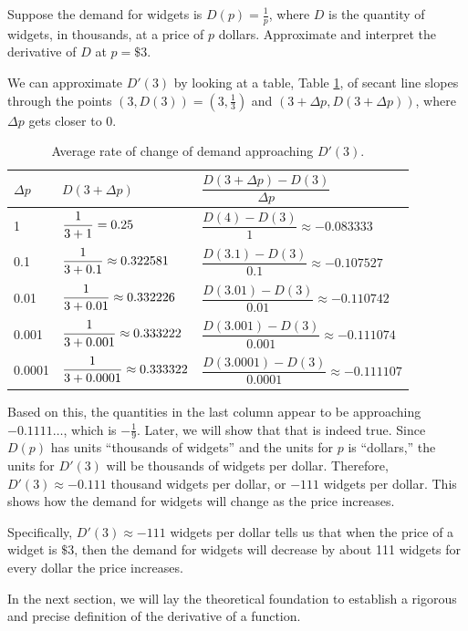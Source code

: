 \begin{example}
Suppose the demand for widgets is $D(p)=\frac{1}{p}$, where $D$ is the quantity of widgets, in thousands, at a price of $p$ dollars. Approximate and interpret the derivative of $D$ at $p=\$3$.

\begin{solution} We can approximate $D'(3)$ by looking at a table, Table \ref{tab:2-3-Dprime}, of secant line slopes through the points $(3, D(3)) = \left(3, \frac{1}{3}\right)$ and $(3+\Delta p, D(3+\Delta p))$, where $\Delta p$ gets closer to $0$.

\begin{table}[ht!]
\begin{centering}
\begin{tabular}{lll}
\toprule
$\Delta p$ & $D(3+\Delta p)$ & $\dfrac{D(3+\Delta p)-D(3)}{\Delta p}$ \\
\midrule
1        & $\dfrac{1\mathstrut}{3+1\mathstrut} = 0.25$                & $\dfrac{D(4)     -D(3)}{1}     \approx -0.083333$ \\
0.1      & $\dfrac{1\mathstrut}{3+0.1\mathstrut} \approx 0.322581$    & $\dfrac{D(3.1)   -D(3)}{0.1}   \approx -0.107527$ \\
0.01     & $\dfrac{1\mathstrut}{3+0.01\mathstrut} \approx 0.332226$   & $\dfrac{D(3.01)  -D(3)}{0.01}  \approx -0.110742$ \\
0.001    & $\dfrac{1\mathstrut}{3+0.001\mathstrut} \approx 0.333222$  & $\dfrac{D(3.001) -D(3)}{0.001} \approx -0.111074$ \\
0.0001   & $\dfrac{1\mathstrut}{3+0.0001\mathstrut} \approx 0.333322$ & $\dfrac{D(3.0001)-D(3)}{0.0001}\approx -0.111107$ \\
\bottomrule
\end{tabular}
\caption{Average rate of change of demand approaching $D'(3)$.}
\label{tab:2-3-Dprime}
\end{centering}
\end{table}
Based on this, the quantities in the last column appear to be approaching $-0.1111\ldots$, which is $-\frac{1}{9}$. Later, we will show that that is indeed true. Since $D(p)$ has units ``thousands of widgets'' and the units for $p$ is ``dollars,'' the units for $D'(3)$ will be thousands of widgets per dollar. Therefore, $D'(3) \approx -0.111$ thousand widgets per dollar, or $-111$ widgets per dollar. This shows how the demand for widgets will change as the price increases.

Specifically, $D'(3)\approx -111$ widgets per dollar tells us that when the price of a widget is $\$3$, then the demand for widgets will decrease by about 111 widgets for every dollar the price increases.
\end{solution}\end{example} 

In the next section, we will lay the theoretical foundation to establish a rigorous and precise definition of the derivative of a function.


